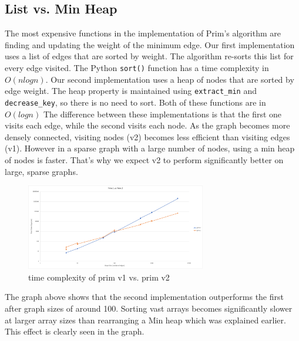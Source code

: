 \documentclass[12pt]{article}
\begin{document}
\subsection{List vs. Min Heap}
The most expensive functions in the implementation of Prim's algorithm are finding and updating the weight of the minimum edge. Our first implementation uses a list of edges that are sorted by weight. The algorithm re-sorts this list for every edge visited. The Python \verb+sort()+ function has a time complexity in $O(nlogn)$. Our second implementation uses a heap of nodes that are sorted by edge weight. The heap property is maintained using \verb+extract_min+ and \verb+decrease_key+, so there is no need to sort. Both of these functions are in $O(logn)$ The difference between these implementations is that the first one visits each edge, while the second visits each node. As the graph becomes more densely connected, visiting nodes (v2) becomes less efficient than visiting edges (v1). However in a sparse graph with a large number of nodes, using a min heap of nodes is faster. That's why we expect v2 to perform significantly better on large, sparse graphs.
\begin{figure}[H]
\centering
\includegraphics[width=0.7\textwidth,height=\textheight,keepaspectratio]{prim1and2.png}
\caption{time complexity of prim v1 vs. prim v2}
\label{Figure: m1}
\end{figure}
\noindent The graph above shows that the second implementation outperforms the first after graph sizes of around 100. Sorting vast arrays becomes significantly slower at larger array sizes than rearranging a Min heap which was explained earlier. This effect is clearly seen in the graph. 
\end{document}

